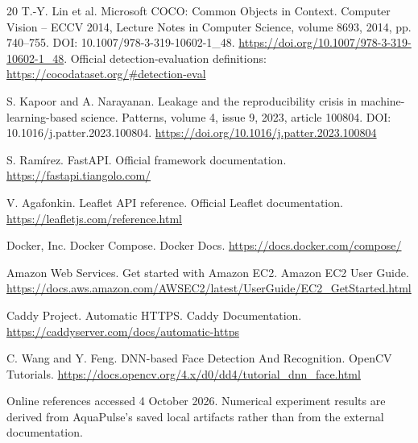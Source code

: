 \documentclass[a4paper,11pt]{article}
\begin{document}
\begin{thebibliography}{20}
 T.-Y. Lin et al. Microsoft COCO: Common Objects in Context. Computer Vision – ECCV 2014, Lecture Notes in Computer Science, volume 8693, 2014, pp. 740–755. DOI: 10.1007/978-3-319-10602-1\_48. \url{https://doi.org/10.1007/978-3-319-10602-1_48}. Official detection-evaluation definitions: \url{https://cocodataset.org/#detection-eval}

 S. Kapoor and A. Narayanan. Leakage and the reproducibility crisis in machine-learning-based science. Patterns, volume 4, issue 9, 2023, article 100804. DOI: 10.1016/j.patter.2023.100804. \url{https://doi.org/10.1016/j.patter.2023.100804}

 S. Ramírez. FastAPI. Official framework documentation. \url{https://fastapi.tiangolo.com/}

 V. Agafonkin. Leaflet API reference. Official Leaflet documentation. \url{https://leafletjs.com/reference.html}

 Docker, Inc. Docker Compose. Docker Docs. \url{https://docs.docker.com/compose/}

 Amazon Web Services. Get started with Amazon EC2. Amazon EC2 User Guide. \url{https://docs.aws.amazon.com/AWSEC2/latest/UserGuide/EC2_GetStarted.html}

 Caddy Project. Automatic HTTPS. Caddy Documentation. \url{https://caddyserver.com/docs/automatic-https}

 C. Wang and Y. Feng. DNN-based Face Detection And Recognition. OpenCV Tutorials. \url{https://docs.opencv.org/4.x/d0/dd4/tutorial_dnn_face.html}

\end{thebibliography}
Online references accessed 4 October 2026. Numerical experiment results are derived from AquaPulse's saved local artifacts rather than from the external documentation.
\end{document}
